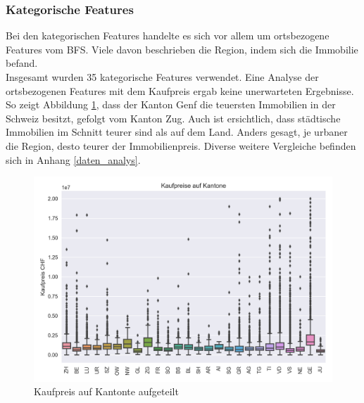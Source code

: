 \subsubsection{Kategorische Features}
Bei den kategorischen Features handelte es sich vor allem um ortsbezogene Features vom BFS. Viele davon beschrieben die Region, indem sich die Immobilie befand.\\
Insgesamt wurden 35 kategorische Features verwendet. Eine Analyse der ortsbezogenen Features mit dem Kaufpreis ergab keine unerwarteten Ergebnisse. So zeigt Abbildung \ref{fig:cantons}, dass der Kanton Genf die teuersten Immobilien in der Schweiz besitzt, gefolgt vom Kanton Zug. Auch ist ersichtlich, dass städtische Immobilien im Schnitt teurer sind als auf dem Land. Anders gesagt, je urbaner die Region, desto teurer der Immobilienpreis. Diverse weitere Vergleiche befinden sich in Anhang \ref{daten_analys}.\\[2ex]
\begin{figure}[ht]
\centering
\includegraphics[width=\textwidth]{images/boxPlot_cantons.png}
\caption[Kaufpreis auf Kantonte aufgeteilt]{Kaufpreis auf Kantonte aufgeteilt}%
\label{fig:cantons}
\end{figure}

